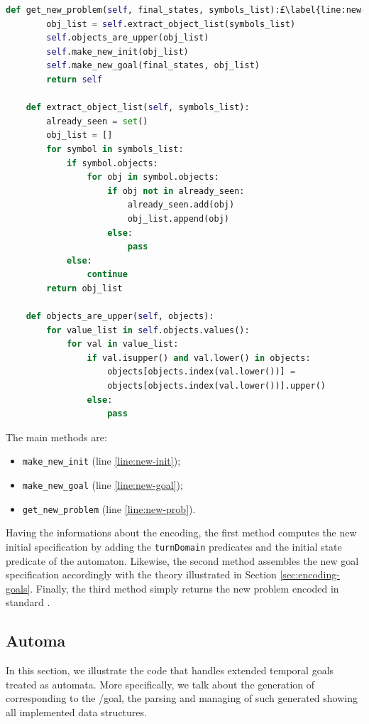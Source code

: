 \begin{lstlisting}[language=Python, style=Python, escapechar = £,  label={code:fond-prob}, caption={The \texttt{Problem} class.}]
    def get_new_problem(self, final_states, symbols_list):£\label{line:new-prob}£
        obj_list = self.extract_object_list(symbols_list)
        self.objects_are_upper(obj_list)
        self.make_new_init(obj_list)
        self.make_new_goal(final_states, obj_list)
        return self

    def extract_object_list(self, symbols_list):
        already_seen = set()
        obj_list = []
        for symbol in symbols_list:
            if symbol.objects:
                for obj in symbol.objects:
                    if obj not in already_seen:
                        already_seen.add(obj)
                        obj_list.append(obj)
                    else:
                        pass
            else:
                continue
        return obj_list

    def objects_are_upper(self, objects):
        for value_list in self.objects.values():
            for val in value_list:
                if val.isupper() and val.lower() in objects:
                    objects[objects.index(val.lower())] = 
                    objects[objects.index(val.lower())].upper()
                else:
                    pass
\end{lstlisting}
The main methods are:
\begin{itemize}
\item \texttt{make\_new\_init} (line \ref{line:new-init});
\item \texttt{make\_new\_goal} (line \ref{line:new-goal});
\item \texttt{get\_new\_problem} (line \ref{line:new-prob}).
\end{itemize}
Having the informations about the \DFA encoding, the first method computes the new initial specification by adding the \texttt{turnDomain} predicates and the initial state predicate of the automaton. Likewise, the second method assembles the new goal specification accordingly with the theory illustrated in Section \ref{sec:encoding-goals}. Finally, the third method simply returns the new problem encoded in standard \PDDL.

\subsection{Automa}\label{sec:impl-automa}
In this section, we illustrate the code that handles extended temporal goals treated as automata. More specifically, we talk about the generation of \DFA corresponding to the \LTLf/\PLTL goal, the parsing and managing of such generated \DFA showing all implemented data structures.


